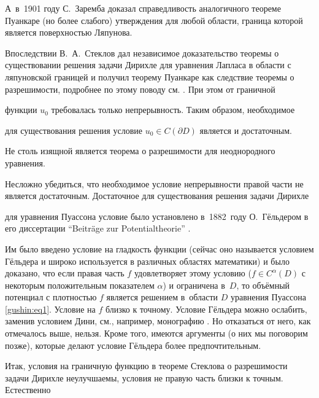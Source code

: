 А~в~1901 году С.~Заремба \cite{gushin:Zaremba} доказал справедливость аналогичного теореме Пуанкаре (но более слабого) утверждения для любой области, граница которой является поверхностью Ляпунова. 


Впоследствии В.~А.~Стеклов дал независимое  доказательство теоремы о существовании решения задачи Дирихле для уравнения Лапласа в области с ляпуновской границей и получил  теорему Пуанкаре как следствие теоремы о разрешимости, подробнее по этому поводу см. \cite{gushin:Kn3}. При этом от граничной

функции $u_0$ требовалась только непрерывность. Таким образом, необходимое

для существования решения условие $u_0 \in C(\partial D)$ является и достаточным.



Не столь изящной является теорема о разрешимости для неоднородного уравнения.

Несложно убедиться, что необходимое условие непрерывности правой части   не является достаточным. Достаточное для существования решения задачи Дирихле

для уравнения Пуассона условие было установлено в~1882~году О.~Гёльдером в его диссертации  ``Beitr\"age zur Potentialtheorie'' \cite{gushin:HolderOtto}. 

Им было введено условие на гладкость функции (сейчас оно называется условием Гёльдера и широко используется в различных областях математики) и было доказано, что если правая часть  $f$ удовлетворяет этому условию ($f \in C^{\alpha}(D)$ с некоторым положительным показателем $\alpha$) и ограничена в~$D$, то объёмный потенциал с плотностью  $f$ является решением в~области $D$ уравнения Пуассона \eqref{gushin:eq1}. Условие на $f$ близко к точному. Условие Гёльдера можно ослабить, заменив условием Дини, см., например, монографию \cite{gushin:GTr}. Но отказаться от него, как отмечалось выше, нельзя. Кроме того, имеются аргументы  (о них мы поговорим позже), которые делают условие Гёльдера более предпочтительным.



Итак, условия на граничную функцию в теореме Стеклова о разрешимости задачи Дирихле неулучшаемы, условия не правую часть близки к точным. Естественно

